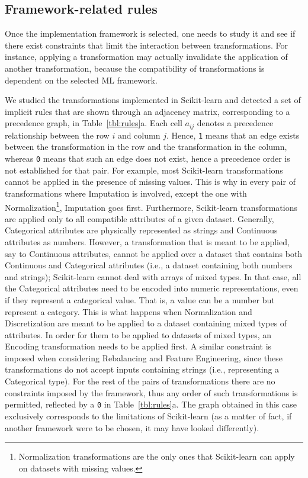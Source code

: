 \subsection{Framework-related rules}
\label{sec:rules-framework}
Once the implementation framework is selected, one needs to study it and see if there exist constraints that limit the interaction between transformations. For instance, applying a transformation may actually invalidate the application of another transformation, because the compatibility of transformations is dependent on the selected ML framework.

\begin{example}
We studied the transformations implemented in Scikit-learn and detected a set of implicit rules that are shown through an adjacency matrix, corresponding to a precedence graph, in Table~\ref{tbl:rules}a.
Each cell $a_{ij}$ denotes a precedence relationship between the row $i$ and column $j$. Hence, \texttt{1} means that an edge exists between the transformation in the row and the transformation in the column, whereas \texttt{0} means that such an edge does not exist, hence a precedence order is not established for that pair. 
For example, most Scikit-learn transformations cannot be applied in the presence of missing values. This is why in every pair of transformations where Imputation is involved, except the one with Normalization\footnote{Normalization transformations are the only ones that Scikit-learn can apply on datasets with missing values.}, Imputation goes first.
Furthermore, Scikit-learn transformations are applied only to all compatible attributes of a given dataset. Generally, Categorical attributes are physically represented as strings and Continuous attributes as numbers. However, a transformation that is meant to be applied, say to Continuous attributes, cannot be applied over a dataset that contains both Continuous and Categorical attributes (i.e., a dataset containing both numbers and strings); Scikit-learn cannot deal with arrays of mixed types. In that case, all the Categorical attributes need to be encoded into numeric representations, even if they represent a categorical value. That is, a value can be a number but represent a category. 
This is what happens when Normalization and Discretization are meant to be applied to a dataset containing mixed types of attributes. In order for them to be applied to datasets of mixed types, an Encoding transformation needs to be applied first. A similar constraint is imposed when considering Rebalancing and Feature Engineering, since these transformations do not accept inputs containing strings (i.e., representing a Categorical type). 
For the rest of the pairs of transformations there are no constraints imposed by the framework, thus any order of such transformations is permitted, reflected by a \texttt{0} in Table~\ref{tbl:rules}a.
The graph obtained in this case exclusively corresponds to the limitations of Scikit-learn (as a matter of fact, if another framework were to be chosen, it may have looked differently).
\end{example}

